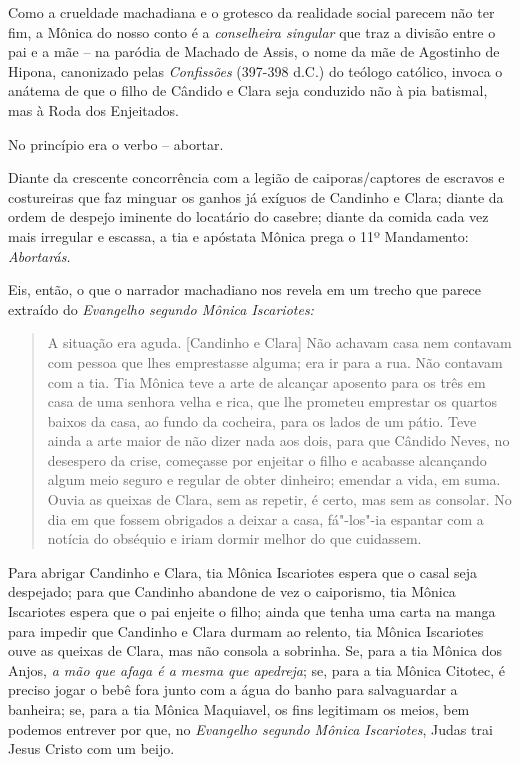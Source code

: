 Como a crueldade machadiana e o grotesco da realidade social parecem não
ter fim, a Mônica do nosso conto é a \emph{conselheira singular} que
traz a divisão entre o pai e a mãe -- na paródia de Machado de Assis, o
nome da mãe de Agostinho de Hipona, canonizado pelas \emph{Confissões}
(397-398 d.C.) do teólogo católico, invoca o anátema de que o filho de
Cândido e Clara seja conduzido não à pia batismal, mas à Roda dos
Enjeitados.

No princípio era o verbo -- abortar.

Diante da crescente concorrência com a legião de caiporas/captores de
escravos e costureiras que faz minguar os ganhos já exíguos de Candinho
e Clara; diante da ordem de despejo iminente do locatário do casebre;
diante da comida cada vez mais irregular e escassa, a tia e apóstata
Mônica prega o 11º Mandamento: \emph{Abortarás. }

Eis, então, o que o narrador machadiano nos revela em um trecho que
parece extraído do \emph{Evangelho segundo Mônica Iscariotes: }

\begin{quote}
A situação era aguda. {[}Candinho e Clara{]} Não achavam casa nem
contavam com pessoa que lhes emprestasse alguma; era ir para a rua. Não
contavam com a tia. Tia Mônica teve a arte de alcançar aposento para os
três em casa de uma senhora velha e rica, que lhe prometeu emprestar os
quartos baixos da casa, ao fundo da cocheira, para os lados de um pátio.
Teve ainda a arte maior de não dizer nada aos dois, para que Cândido
Neves, no desespero da crise, começasse por enjeitar o filho e acabasse
alcançando algum meio seguro e regular de obter dinheiro; emendar a
vida, em suma. Ouvia as queixas de Clara, sem as repetir, é certo, mas
sem as consolar. No dia em que fossem obrigados a deixar a casa,
fá"-los"-ia espantar com a notícia do obséquio e iriam dormir melhor do
que cuidassem.
\end{quote}

Para abrigar Candinho e Clara, tia Mônica Iscariotes espera que o casal
seja despejado; para que Candinho abandone de vez o caiporismo, tia
Mônica Iscariotes espera que o pai enjeite o filho; ainda que tenha uma
carta na manga para impedir que Candinho e Clara durmam ao relento, tia
Mônica Iscariotes ouve as queixas de Clara, mas não consola a sobrinha.
Se, para a tia Mônica dos Anjos, \emph{a mão que afaga é a mesma que
apedreja}; se, para a tia Mônica Citotec, é preciso jogar o bebê fora
junto com a água do banho para salvaguardar a banheira; se, para a tia
Mônica Maquiavel, os fins legitimam os meios, bem podemos entrever por
que, no \emph{Evangelho segundo Mônica Iscariotes}, Judas trai Jesus
Cristo com um beijo.

